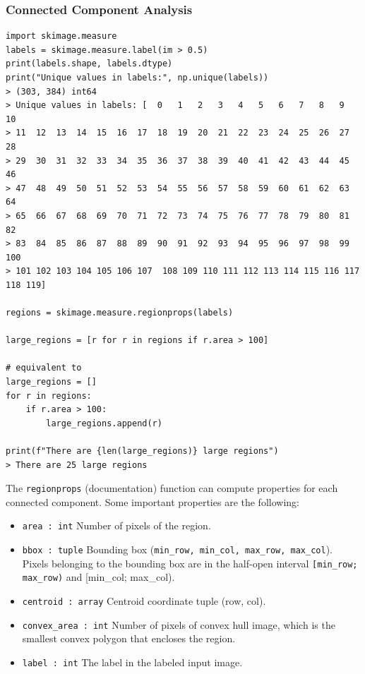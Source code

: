 \subsubsection{Connected Component Analysis}
\begin{verbatim}
import skimage.measure
labels = skimage.measure.label(im > 0.5)
print(labels.shape, labels.dtype)
print("Unique values in labels:", np.unique(labels))
> (303, 384) int64
> Unique values in labels: [  0   1   2   3   4   5   6   7   8   9  10
> 11  12  13  14  15  16  17  18  19  20  21  22  23  24  25  26  27  28
> 29  30  31  32  33  34  35  36  37  38  39  40  41  42  43  44  45  46
> 47  48  49  50  51  52  53  54  55  56  57  58  59  60  61  62  63  64
> 65  66  67  68  69  70  71  72  73  74  75  76  77  78  79  80  81  82
> 83  84  85  86  87  88  89  90  91  92  93  94  95  96  97  98  99 100
> 101 102 103 104 105 106 107  108 109 110 111 112 113 114 115 116 117 118 119]

regions = skimage.measure.regionprops(labels)

large_regions = [r for r in regions if r.area > 100]

# equivalent to
large_regions = []
for r in regions:
	if r.area > 100:
		large_regions.append(r)

print(f"There are {len(large_regions)} large regions")
> There are 25 large regions
\end{verbatim}
\noindent
The \texttt{regionprops} (documentation) function can compute properties for each connected component. Some important properties are the following:
\begin{itemize}[label=,nosep,leftmargin=*, labelindent=0.5cm]
	\item \texttt{area : int} Number of pixels of the region.
	\item \texttt{bbox : tuple} Bounding box (\texttt{min\_row, min\_col, max\_row, max\_col}).
		Pixels belonging to the bounding box are in the half-open interval \texttt{[min\_row; max\_row)} and [min\_col; max\_col).
	\item \texttt{centroid : array} Centroid coordinate tuple (row, col).
	\item \texttt{convex_area : int} Number of pixels of convex hull image, which is the smallest convex polygon that encloses the region.
	\item \texttt{label : int} The label in the labeled input image.
\end{itemize}

